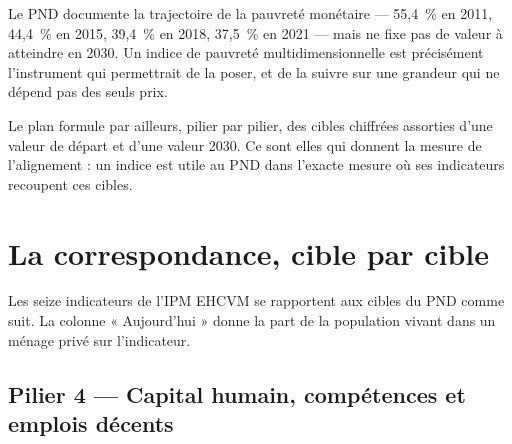 \documentclass[11pt,a4paper]{article}
\begin{document}
\begin{retenir}
Le PND documente la trajectoire de la pauvreté monétaire --- 55,4~\% en 2011, 44,4~\% en 2015,
39,4~\% en 2018, 37,5~\% en 2021 --- mais ne fixe pas de valeur à atteindre en 2030. Un indice de
pauvreté multidimensionnelle est précisément l'instrument qui permettrait de la poser, et de la
suivre sur une grandeur qui ne dépend pas des seuls prix.
\end{retenir}

Le plan formule par ailleurs, pilier par pilier, des cibles chiffrées assorties d'une valeur de
départ et d'une valeur 2030. Ce sont elles qui donnent la mesure de l'alignement : un indice est
utile au PND dans l'exacte mesure où ses indicateurs recoupent ces cibles.

\section{La correspondance, cible par cible}
\label{sec:correspondance}

Les seize indicateurs de l'IPM EHCVM se rapportent aux cibles du PND comme suit. La colonne
« Aujourd'hui » donne la part de la population vivant dans un ménage privé sur l'indicateur.

\subsection{Pilier 4 --- Capital humain, compétences et emplois décents}
\end{document}
